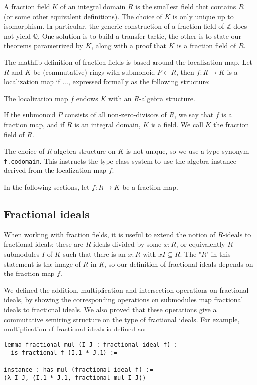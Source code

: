 \documentclass{lipics-v2021}
\newcommand{\lean}[1]{\texttt{#1}\xspace} %
\newcommand{\Q}{\mathbb{Q}}
\newcommand{\Z}{\mathbb{Z}}
\begin{document}
A fraction field $K$ of an integral domain $R$ is the smallest field that contains $R$ (or some other equivalent definitions).
The choice of $K$ is only unique up to isomorphism.
In particular, the generic construction of a fraction field of $\Z$ does not yield $\Q$.
One solution is to build a transfer tactic, the other is to state our theorems parametrized by $K$, along with a proof that $K$ is a fraction field of $R$.

The mathlib definition of fraction fields is based around the localization map. Let $R$ and $K$ be (commutative) rings with submonoid $P \subset R$, then $f : R \to K$ is a localization map if ..., expressed formally as the following structure:

The localization map $f$ endows $K$ with an $R$-algebra structure.

If the submonoid $P$ consists of all non-zero-divisors of $R$, we say that $f$ is a fraction map, and if $R$ is an integral domain, $K$ is a field. We call $K$ the fraction field of $R$.

The choice of $R$-algebra structure on $K$ is not unique, so we use a type synonym \lean{f.codomain}. This instructs the type class system to use the algebra instance derived from the localization map $f$.

In the following sections, let $f : R \to K$ be a fraction map.

\subsection{Fractional ideals}

When working with fraction fields, it is useful to extend the notion of $R$-ideals to fractional ideals: these are $R$-ideals divided by some $x : R$, or equivalently $R$-submodules $I$ of $K$ such that there is an $x : R$ with $x I \subseteq R$. The "$R$" in this statement is the image of $R$ in $K$, so our definition of fractional ideals depends on the fraction map $f$.

We defined the addition, multiplication and intersection operations on fractional ideals,
by showing the corresponding operations on submodules map fractional ideals to fractional ideals.
We also proved that these operations give a commutative semiring structure on the type of fractional ideals.
For example, multiplication of fractional ideals is defined as:
\begin{lstlisting}
lemma fractional_mul (I J : fractional_ideal f) :
  is_fractional f (I.1 * J.1) := _

instance : has_mul (fractional_ideal f) :=
⟨λ I J, ⟨I.1 * J.1, fractional_mul I J⟩⟩
\end{lstlisting}
\end{document}
